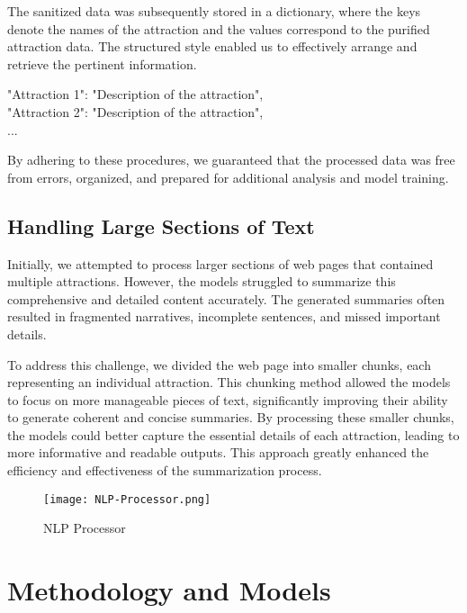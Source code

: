 \documentclass[conference]{IEEEtran}
\begin{document}
    The sanitized data was subsequently stored in a dictionary, where the keys denote the names of the attraction and the values correspond to the purified attraction data. The structured style enabled us to effectively arrange and retrieve the pertinent information.

    \begin{tcolorbox}[linewidth=1pt, innerleftmargin=15pt, innerrightmargin=15pt, innertopmargin=15pt, innerbottommargin=15pt]
    "Attraction 1": "Description of the attraction",\\
    "Attraction 2": "Description of the attraction",\\
    ...
    \end{tcolorbox}

    By adhering to these procedures, we guaranteed that the processed data was free from errors, organized, and prepared for additional analysis and model training.

    \subsection{Handling Large Sections of Text}
    Initially, we attempted to process larger sections of web pages that contained multiple attractions. However, the models struggled to summarize this comprehensive and detailed content accurately. The generated summaries often resulted in fragmented narratives, incomplete sentences, and missed important details.

    To address this challenge, we divided the web page into smaller chunks, each representing an individual attraction. This chunking method allowed the models to focus on more manageable pieces of text, significantly improving their ability to generate coherent and concise summaries. By processing these smaller chunks, the models could better capture the essential details of each attraction, leading to more informative and readable outputs. This approach greatly enhanced the efficiency and effectiveness of the summarization process.

    \begin{figure}
        \centering
        \texttt{[image: NLP-Processor.png]}
        \caption{NLP Processor}
        \label{fig:nlp-processor}
    \end{figure}

\section{Methodology and Models}
\end{document}
